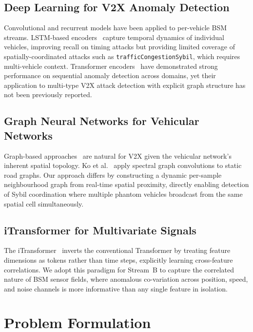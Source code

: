 \documentclass[conference]{IEEEtran}
\begin{document}
\subsection{Deep Learning for V2X Anomaly Detection}

Convolutional and recurrent models have been applied to per-vehicle BSM
streams.  LSTM-based encoders~\cite{ercan2022misbehavior} capture temporal
dynamics of individual vehicles, improving recall on timing attacks but
providing limited coverage of spatially-coordinated attacks such as
\texttt{trafficCongestionSybil}, which requires multi-vehicle context.
Transformer encoders~\cite{vaswani2017attention} have demonstrated strong
performance on sequential anomaly detection across domains, yet their
application to multi-type V2X attack detection with explicit graph
structure has not been previously reported.

\subsection{Graph Neural Networks for Vehicular Networks}

Graph-based approaches~\cite{velickovic2018gat} are natural for V2X given
the vehicular network's inherent spatial topology.  Ko et
al.~\cite{ko2020vcn} apply spectral graph convolutions to static road
graphs.  Our approach differs by constructing a dynamic per-sample
neighbourhood graph from real-time spatial proximity, directly enabling
detection of Sybil coordination where multiple phantom vehicles broadcast
from the same spatial cell simultaneously.

\subsection{iTransformer for Multivariate Signals}

The iTransformer~\cite{itransformer2024} inverts the conventional
Transformer by treating feature dimensions as tokens rather than time
steps, explicitly learning cross-feature correlations.  We adopt this
paradigm for Stream~B to capture the correlated nature of BSM sensor
fields, where anomalous co-variation across position, speed, and noise
channels is more informative than any single feature in isolation.

\section{Problem Formulation}
\label{sec:problem}
\end{document}
